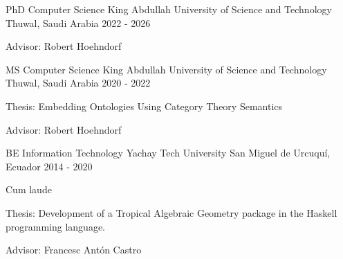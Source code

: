 

\begin{cventries}

  \cventry
  {PhD Computer Science} %
  {King Abdullah University of Science and Technology} %
  {Thuwal, Saudi Arabia} %
  {2022 - 2026} %
    {
      \begin{cvitems} %
      \item {Advisor: Robert Hoehndorf}
      \end{cvitems}
    }

  \cventry
  {MS Computer Science} %
  {King Abdullah University of Science and Technology} %
  {Thuwal, Saudi Arabia} %
  {2020 - 2022} %
    {
      \begin{cvitems} %
      \item {Thesis: Embedding Ontologies Using Category Theory Semantics}
      \item {Advisor: Robert Hoehndorf}
      \end{cvitems}
    }

  \cventry
  {BE Information Technology} %
  {Yachay Tech University} %
  {San Miguel de Urcuquí, Ecuador} %
    {2014 - 2020} %
    {
      \begin{cvitems} %
      \item {Cum laude}
      \item {Thesis: Development of a Tropical Algebraic Geometry package in the Haskell programming language.}
      \item {Advisor: Francesc Antón Castro}
      \end{cvitems}
    }

\end{cventries}
